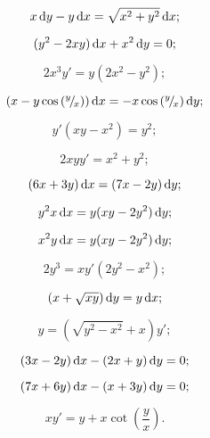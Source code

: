 \begin{multicols}{2}
	\begin{problem}
		\[ x \mathop{}\!\mathrm{d} y - y \mathop{}\!\mathrm{d} x = \sqrt{x^2 + y^2} \mathop{}\!\mathrm{d} x; \]
	\end{problem}
	
	\begin{problem}
		\[ (y^2 - 2 x y) \mathop{}\!\mathrm{d} x + x^2 \mathop{}\!\mathrm{d} y = 0; \]
	\end{problem}
	
	\begin{problem}
		\[ 2 x^3 y' = y (2 x^2 - y^2); \]
	\end{problem}
	
	\begin{problem}
		\[ \left( x - y \cos \left({}^{y}\!/_{\!x}\right)\right) \mathop{}\!\mathrm{d} x = - x \cos \left({}^{y}\!/_{\!x}\right) \mathop{}\!\mathrm{d} y; \]
	\end{problem}
	
	\begin{problem}
		\[ y' (x y - x^2) = y^2; \]
	\end{problem}
	
	\begin{problem}
		\[ 2 x y y' = x^2 + y^2; \]
	\end{problem}
	
	\begin{problem}
		\[ (6 x + 3 y) \mathop{}\!\mathrm{d} x = (7 x - 2 y) \mathop{}\!\mathrm{d} y; \]
	\end{problem}
	
	\begin{problem}
		\[ y^2 x \mathop{}\!\mathrm{d} x = y (x y - 2 y^2) \mathop{}\!\mathrm{d} y; \]
	\end{problem}
	
	\begin{problem}
		\[ x^2 y \mathop{}\!\mathrm{d} x = y (x y - 2 y^2) \mathop{}\!\mathrm{d} y; \]
	\end{problem}
	
	\begin{problem}
		\[ 2 y^3 = x y' (2 y^2 - x^2); \]
	\end{problem}
	
	\begin{problem}
		\[ \left( x + \sqrt{x y}\right) \mathop{}\!\mathrm{d} y = y \mathop{}\!\mathrm{d} x; \]
	\end{problem}
	
	\begin{problem}
		\[ y = \left( \sqrt{y^2 - x^2} + x \right) y'; \]
	\end{problem}
	
	\begin{problem}
		\[ (3 x - 2 y) \mathop{}\!\mathrm{d} x - (2 x + y) \mathop{}\!\mathrm{d} y = 0; \]
	\end{problem}
	
	\begin{problem}
		\[ (7 x + 6 y) \mathop{}\!\mathrm{d} x - (x + 3 y) \mathop{}\!\mathrm{d} y = 0; \]
	\end{problem}
	
	\begin{problem}
		\[ x y' = y + x \cot \left(\frac{y}{x}\right). \]
	\end{problem}
\end{multicols}

